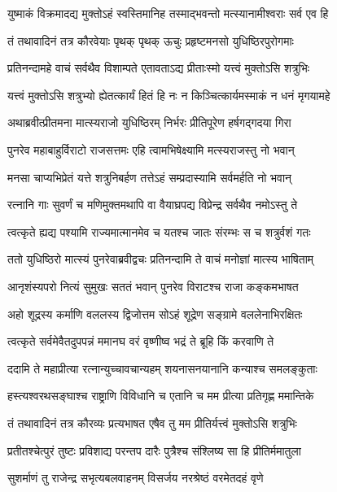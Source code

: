 \twolineshloka
{युष्माकं विक्रमादद्य मुक्तोऽहं स्वस्तिमानिह}
{तस्माद्भवन्तो मत्स्यानामीश्वराः सर्व एव हि}



\twolineshloka
{तं तथावादिनं तत्र कौरवेयाः पृथक् पृथक्}
{ऊचुः प्रहृष्टमनसो युधिष्ठिरपुरोगमाः}


\twolineshloka
{प्रतिनन्दामहे वाचं सर्वथैव विशाम्पते}
{एतावताऽद्य प्रीताःस्मो यत्त्वं मुक्तोऽसि शत्रुभिः}


\twolineshloka
{यत्त्वं मुक्तोऽसि शत्रुभ्यो ह्येतत्कार्यं हितं हि नः}
{न किञ्चित्कार्यमस्माकं न धनं मृगयामहे}


\twolineshloka
{अथाब्रवीत्प्रीतमना मात्स्यराजो युधिष्ठिरम्}
{निर्भरः प्रीतिपूरेण हर्षगद्गदया गिरा}


\twolineshloka
{पुनरेव महाबाहुर्विराटो राजसत्तमः}
{एहि त्वामभिषेक्ष्यामि मत्स्यराजस्तु नो भवान्}


\twolineshloka
{मनसा चाप्यभिप्रेतं यत्ते शत्रुनिबर्हण}
{तत्तेऽहं सम्प्रदास्यामि सर्वमर्हति नो भवान्}


\twolineshloka
{रत्नानि गाः सुवर्णं च मणिमुक्तमथापि वा}
{वैयाघ्रपद्य विप्रेन्द्र सर्वथैव नमोऽस्तु ते}


\twolineshloka
{त्वत्कृते ह्यद्य पश्यामि राज्यमात्मानमेव च}
{यतश्च जातः संरम्भः स च शत्रुर्वशं गतः}


\twolineshloka
{ततो युधिष्ठिरो मात्स्यं पुनरेवाब्रवीद्वचः}
{प्रतिनन्दामि ते वाचं मनोज्ञां मात्स्य भाषिताम्}


\twolineshloka
{आनृशंस्यपरो नित्यं सुमुखः सततं भवान्}
{पुनरेव विराटश्च राजा कङ्कमभाषत}


\twolineshloka
{अहो शूद्रस्य कर्माणि वललस्य द्विजोत्तम}
{सोऽहं शूद्रेण सङ्ग्रामे वललेनाभिरक्षितः}


\twolineshloka
{त्वत्कृते सर्वमेवैतदुपपन्नं ममानघ}
{वरं वृष्णीष्व भद्रं ते ब्रूहि किं करवाणि ते}


\twolineshloka
{ददामि ते महाप्रीत्या रत्नान्युच्चावचान्यहम्}
{शयनासनयानानि कन्याश्च समलङ्कुताः}


\twolineshloka
{हस्त्यश्वरथसङ्घाश्च राष्ट्राणि विविधानि च}
{एतानि च मम प्रीत्या प्रतिगृह्ण ममान्तिके}



\twolineshloka
{तं तथावादिनं तत्र कौरव्यः प्रत्यभाषत}
{एषैव तु मम प्रीतिर्यत्त्वं मुक्तोऽसि शत्रुभिः}


\twolineshloka
{प्रतीतश्चेत्पुरं तुष्टः प्रविशाद्य परन्तप}
{दारैः पुत्रैश्च संश्लिष्य सा हि प्रीतिर्ममातुला}


\twolineshloka
{सुशर्माणं तु राजेन्द्र सभृत्यबलवाहनम्}
{विसर्जय नरश्रेष्ठं वरमेतदहं वृणे}


